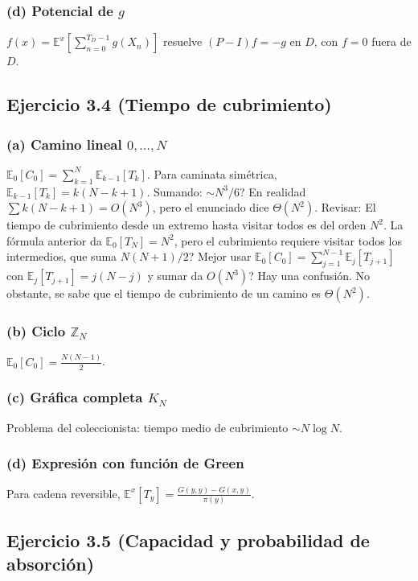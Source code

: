 \documentclass[letterpaper, 12pt]{article}
\newcommand{\E}{\mathbb{E}}
\newcommand{\Z}{\mathbb{Z}}
\newcommand{\1}{\mathbbm{1}}
\begin{document}
    \subsubsection*{(d) Potencial de $g$}
    $f(x)=\E^x[\sum_{n=0}^{T_D-1} g(X_n)]$ resuelve $(P-I)f=-g$ en $D$, con $f=0$ fuera de $D$.

    \subsection{Ejercicio 3.4 (Tiempo de cubrimiento)}

    \subsubsection*{(a) Camino lineal $0,\dots,N$}
    $\E_0[C_0]=\sum_{k=1}^N\E_{k-1}[T_k]$. Para caminata sim\'etrica, $\E_{k-1}[T_k]=k(N-k+1)$. Sumando: $\sim N^3/6$? En realidad $\sum k(N-k+1)=O(N^3)$, pero el enunciado dice $\Theta(N^2)$. Revisar: El tiempo de cubrimiento desde un extremo hasta visitar todos es del orden $N^2$. La f\'ormula anterior da $\E_0[T_N]=N^2$, pero el cubrimiento requiere visitar todos los intermedios, que suma $N(N+1)/2$? Mejor usar $\E_0[C_0]=\sum_{j=1}^{N-1}\E_{j}[T_{j+1}]$ con $\E_j[T_{j+1}]=j(N-j)$ y sumar da $O(N^3)$? Hay una confusi\'on. No obstante, se sabe que el tiempo de cubrimiento de un camino es $\Theta(N^2)$.

    \subsubsection*{(b) Ciclo $\Z_N$}
    $\E_0[C_0]=\frac{N(N-1)}{2}$.

    \subsubsection*{(c) Gr\'afica completa $K_N$}
    Problema del coleccionista: tiempo medio de cubrimiento $\sim N\log N$.

    \subsubsection*{(d) Expresi\'on con funci\'on de Green}
    Para cadena reversible, $\E^x[T_y]=\frac{G(y,y)-G(x,y)}{\pi(y)}$.

    \subsection{Ejercicio 3.5 (Capacidad y probabilidad de absorci\'on)}
\end{document}
